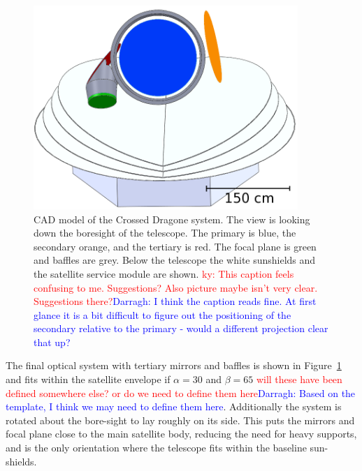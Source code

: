 \documentclass[11pt,a4paper]{article}
\newcommand{\comred}[1]{\textcolor{red}{#1}}
\newcommand{\comblue}[1]{\textcolor{blue}{#1}}
\begin{document}
\begin{figure}[htbp] %
	\centering
	\includegraphics[width=10cm]{full_xdragone.png} 
	\caption{CAD model of the Crossed Dragone system.  The view is looking down the boresight of the telescope. The 
		primary is blue, the secondary orange, and the tertiary is red.  The focal plane is green and baffles are grey.
		Below the telescope the white sunshields and the satellite service module are shown.
		\comred{ky: This caption feels confusing to me. Suggestions? Also picture maybe isn't very clear. Suggestions there?}\comblue{Darragh: I think the caption reads fine. At first glance it is a bit difficult to figure out the positioning of the secondary relative to the primary - would a different projection clear that up?}
	}
	\label{fig:full_xdragone}
\end{figure}

The final optical system with tertiary mirrors and baffles is shown in Figure~\ref{fig:full_xdragone} and fits within 
the satellite envelope if 
$\alpha = 30$ and $\beta = 65$ \comred{will these have been defined somewhere else? or do we need to define them here}\comblue{Darragh: Based on the template, I think we may need to define them here}. 
Additionally the system is rotated about the bore-sight to lay roughly 
on its side.  This puts the mirrors and focal plane close to the main satellite body, reducing the need for 
heavy supports, and is the only orientation where the telescope fits within the baseline sun-shields. 


\end{document}

